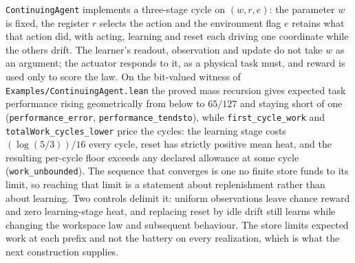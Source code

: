 \documentclass{article}
\begin{document}
\texttt{ContinuingAgent} implements a three-stage cycle on $(w,r,e)$: the
parameter $w$ is fixed, the register $r$ selects the action and the environment
flag $e$ retains what that action did, with acting, learning and reset each
driving one coordinate while the others drift. The learner's readout,
observation and update do not take $w$ as an argument; the actuator responds to
it, as a physical task must, and reward is used only to score the law. On the
bit-valued witness of \nolinkurl{Examples/ContinuingAgent.lean} the proved mass
recursion gives expected task performance rising geometrically from below to
$65/127$ and staying short of one
(\nolinkurl{performance_error}, \nolinkurl{performance_tendsto}),
while \nolinkurl{first_cycle_work} and
\nolinkurl{totalWork_cycles_lower} price the cycles: the
learning stage costs $(\log(5/3))/16$ every cycle, reset has strictly positive
mean heat, and the resulting per-cycle floor exceeds any declared allowance at
some cycle (\nolinkurl{work_unbounded}). The sequence that converges
is one no finite store funds to its limit, so reaching that limit is a
statement about replenishment rather than about learning. Two controls delimit
it: uniform observations leave chance reward and zero learning-stage heat, and
replacing reset by idle drift still learns while changing the workspace law and
subsequent behaviour. The store limits expected work at each prefix and not the
battery on every realization, which is what the next construction supplies.
\end{document}
